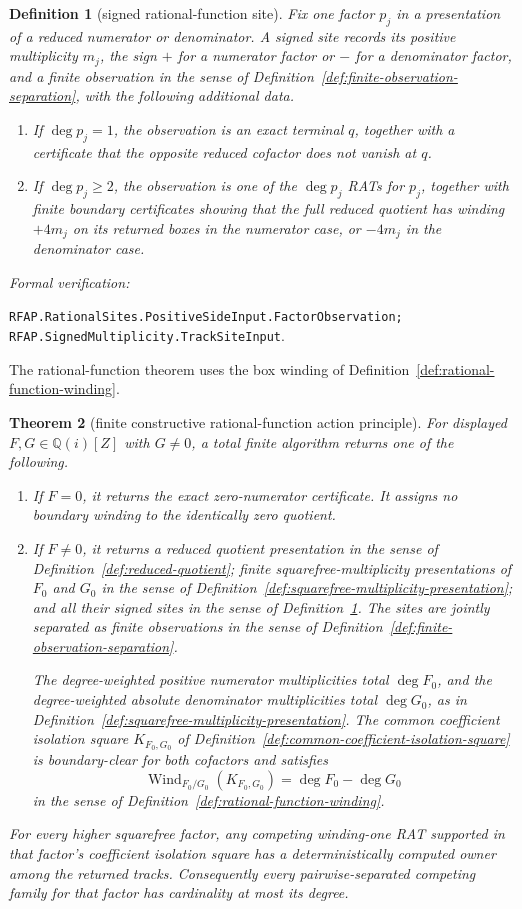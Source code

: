 \documentclass[11pt]{article}
\newtheorem{theorem}{Theorem}[section]
\newtheorem{definition}[theorem]{Definition}
\newcommand{\Qi}{\mathbb{Q}(i)}
\newcommand{\Wind}{\operatorname{Wind}}
\newcommand{\Defref}[1]{Definition~\ref{#1}}
\newcommand{\leanref}[1]{\par\smallskip\noindent
  \emph{Formal verification:}\par\nobreak
  {\raggedright\nolinkurl{#1}.\par}}
\begin{document}
\begin{definition}[signed rational-function site]
\label{def:signed-site}
Fix one factor $p_j$ in a presentation of a reduced numerator or
denominator.  A \emph{signed site} records its positive multiplicity $m_j$,
the sign $+$ for a numerator factor or $-$ for a denominator factor, and a
finite observation in the sense of
\Defref{def:finite-observation-separation}, with the following additional
data.
\begin{enumerate}[label=(\roman*)]
\item If $\deg p_j=1$, the observation is an exact terminal $q$, together
with a certificate that the opposite reduced cofactor does not vanish at
$q$.
\item If $\deg p_j\ge2$, the observation is one of the $\deg p_j$ RATs for
$p_j$, together with
finite boundary certificates showing that the full reduced quotient has
winding $+4m_j$ on its returned boxes in the numerator case, or $-4m_j$ in
the denominator case.
\end{enumerate}
\end{definition}

\leanref{RFAP.RationalSites.PositiveSideInput.FactorObservation;
RFAP.SignedMultiplicity.TrackSiteInput}

The rational-function theorem uses the box winding of
\Defref{def:rational-function-winding}.

\begin{theorem}[finite constructive rational-function action principle]
\label{thm:rfap-general}
For displayed $F,G\in\Qi[Z]$ with $G\ne0$, a total finite algorithm returns
one of the following.
\begin{enumerate}[label=(\alph*)]
\item If $F=0$, it returns the exact zero-numerator certificate.  It assigns
no boundary winding to the identically zero quotient.
\item If $F\ne0$, it returns a reduced quotient presentation in the sense of
\Defref{def:reduced-quotient}; finite squarefree-multiplicity presentations
of $F_0$ and $G_0$ in the sense of
\Defref{def:squarefree-multiplicity-presentation}; and all their signed
sites in the sense of \Defref{def:signed-site}.  The sites are jointly
separated as finite observations in the sense of
\Defref{def:finite-observation-separation}.

The degree-weighted positive numerator multiplicities total $\deg F_0$, and
the degree-weighted absolute denominator multiplicities total $\deg G_0$, as in
\Defref{def:squarefree-multiplicity-presentation}.  The common coefficient
isolation square $K_{F_0,G_0}$ of
\Defref{def:common-coefficient-isolation-square} is boundary-clear for both
cofactors and satisfies
\[
             \Wind_{F_0/G_0}(K_{F_0,G_0})
                    =\deg F_0-\deg G_0
\]
in the sense of \Defref{def:rational-function-winding}.
\end{enumerate}
For every higher squarefree factor, any competing winding-one RAT supported
in that factor's coefficient isolation square has a deterministically
computed owner among the returned tracks.  Consequently every
pairwise-separated competing family for that factor has cardinality at most
its degree.
\end{theorem}
\end{document}
